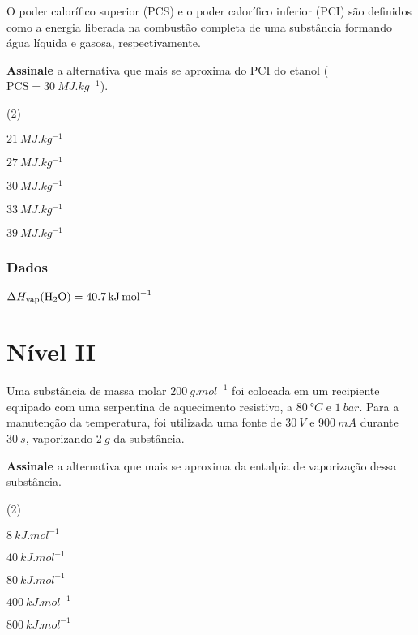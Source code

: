 \documentclass[braun, twocolumn]{braun}
\begin{document}
\begin{problem}
[2A28]O poder calorífico superior (PCS) e o poder calorífico inferior (PCI)
são definidos como a energia liberada na combustão completa de uma
substância formando água líquida e gasosa, respectivamente.

\textbf{Assinale} a alternativa que mais se aproxima do PCI do etanol
(\(\text{PCS} = \qty{30}{MJ.kg^{-1}}\)).


\begin{choices}
(2)
\item \(\qty{21}{MJ.kg^{-1}}\)

\item \(\qty{27}{MJ.kg^{-1}}\)

\item \(\qty{30}{MJ.kg^{-1}}\)

\item \(\qty{33}{MJ.kg^{-1}}\)

\item \(\qty{39}{MJ.kg^{-1}}\)

\end{choices}
\subsubsection*{Dados}


\begin{datalist}

\item $\Delta H_\text{vap}(\ce{H2O}) = \qty{40,7}{kJ.mol^{-1}}$
\end{datalist}

\end{problem}
\section{Nível II}


\begin{problem}
[2A29]Uma substância de massa molar \(\qty{200}{g.mol^{-1}}\) foi colocada em um
recipiente equipado com uma serpentina de aquecimento resistivo, a
\(\qty{80}{\degree C}\) e \(\qty{1}{bar}\). Para a manutenção da
temperatura, foi utilizada uma fonte de \(\qty{30}{V}\) e \(\qty{900}{mA}\)
durante \(\qty{30}{s}\), vaporizando \(\qty{2}{g}\) da substância.

\textbf{Assinale} a alternativa que mais se aproxima da entalpia de
vaporização dessa substância.


\begin{choices}
(2)
\item \(\qty{8}{kJ.mol^{-1}}\)

\item \(\qty{40}{kJ.mol^{-1}}\)

\item \(\qty{80}{kJ.mol^{-1}}\)

\item \(\qty{400}{kJ.mol^{-1}}\)

\item \(\qty{800}{kJ.mol^{-1}}\)

\end{choices}

\end{problem}
\end{document}
